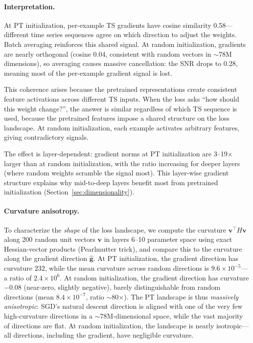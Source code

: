 \paragraph{Interpretation.} At PT initialization, per-example TS gradients have cosine similarity 0.58---different time series sequences agree on which direction to adjust the weights. Batch averaging reinforces this shared signal. At random initialization, gradients are nearly orthogonal (cosine 0.04, consistent with random vectors in $\sim$78M dimensions), so averaging causes massive cancellation: the SNR drops to 0.28, meaning most of the per-example gradient signal is lost.

This coherence arises because the pretrained representations create consistent feature activations across different TS inputs. When the loss asks ``how should this weight change?'', the answer is similar regardless of which TS sequence is used, because the pretrained features impose a shared structure on the loss landscape. At random initialization, each example activates arbitrary features, giving contradictory signals.

The effect is layer-dependent: gradient norms at PT initialization are 3--19$\times$ larger than at random initialization, with the ratio increasing for deeper layers (where random weights scramble the signal most). This layer-wise gradient structure explains why mid-to-deep layers benefit most from pretrained initialization (Section~\ref{sec:dimensionality}).

\paragraph{Curvature anisotropy.} To characterize the \emph{shape} of the loss landscape, we compute the curvature $\mathbf{v}^\top H \mathbf{v}$ along 200 random unit vectors $\mathbf{v}$ in layers 6--10 parameter space using exact Hessian-vector products (Pearlmutter trick), and compare this to the curvature along the gradient direction $\hat{\mathbf{g}}$. At PT initialization, the gradient direction has curvature $232$, while the mean curvature across random directions is $9.6 \times 10^{-5}$---a ratio of $2.4 \times 10^6$. At random initialization, the gradient direction has curvature $-0.08$ (near-zero, slightly negative), barely distinguishable from random directions (mean $8.4 \times 10^{-7}$, ratio $\sim$80$\times$). The PT landscape is thus \emph{massively anisotropic}: SGD's natural descent direction is aligned with one of the very few high-curvature directions in a $\sim$78M-dimensional space, while the vast majority of directions are flat. At random initialization, the landscape is nearly isotropic---all directions, including the gradient, have negligible curvature.